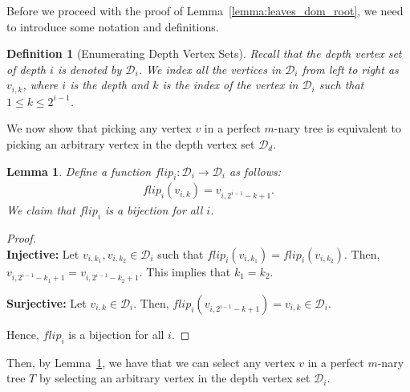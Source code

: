 \documentclass{amsart}
\newtheorem{lemma}[theorem]{Lemma}
\newtheorem{definition}[theorem]{Definition}
\theoremstyle{definition}
\begin{document}
Before we proceed with the proof of Lemma~\ref{lemma:leaves_dom_root}, we need to introduce some notation and definitions.

\begin{definition}[Enumerating Depth Vertex Sets]
	Recall that the depth vertex set of depth $i$ is denoted by $\mathcal{D}_i$. We index all the vertices in $\mathcal{D}_i$ from left to right as $v_{i, k}$, where $i$ is the depth and $k$ is the index of the vertex in $\mathcal{D}_i$ such that $1 \leq k \leq 2^{i - 1}$.
\end{definition}

We now show that picking any vertex $v$ in a perfect $m$-nary tree is equivalent to picking an arbitrary vertex in the depth vertex set $\mathcal{D}_d$. 

\begin{lemma}\label{lemma:vertex_in_depth}
	Define a function $flip_i : \mathcal{D}_i \to \mathcal{D}_i$ as follows:
	\begin{align*}
		flip_i(v_{i, k}) = v_{i, 2^{i - 1} - k + 1}.
	\end{align*}
	We claim that $flip_i$ is a bijection for all $i$.
\end{lemma}
\begin{proof}
	$ $	
	\\
	\textbf{Injective:} Let $v_{i, k_1}, v_{i, k_2} \in \mathcal{D}_i$ such that $flip_i(v_{i, k_1}) = flip_i(v_{i, k_2})$. Then, $v_{i, 2^{i - 1} - k_1 + 1} = v_{i, 2^{i - 1} - k_2 + 1}$. This implies that $k_1 = k_2$.
	\vspace{0.5em}

	\noindent \textbf{Surjective:} Let $v_{i, k} \in \mathcal{D}_i$. Then, $flip_i(v_{i, 2^{i - 1} - k + 1}) = v_{i, k} \in \mathcal{D}_i$.
	\vspace{0.5em}

	\noindent Hence, $flip_i$ is a bijection for all $i$.
\end{proof}

Then, by Lemma~\ref{lemma:vertex_in_depth}, we have that we can select any vertex $v$ in a perfect $m$-nary tree $T$ by selecting an arbitrary vertex in the depth vertex set $\mathcal{D}_i$.
\vspace{1em}
\end{document}
